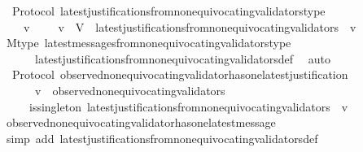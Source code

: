 \begin{isabellebody}
\isanewline
\isanewline
{}\isamarkupfalse%
\ {\isacharparenleft}\ Protocol{\isacharparenright}\ latest{\isacharunderscore}justifications{\isacharunderscore}from{\isacharunderscore}non{\isacharunderscore}equivocating{\isacharunderscore}validators{\isacharunderscore}type\ {\isacharcolon}\isanewline
\ \ {\isachardoublequoteopen}{\isasymforall}\ {\isasymsigma}\ v{\isachardot}\ {\isasymsigma}\ {\isasymin}\ {\isasymSigma}\ {\isasymand}\ v\ {\isasymin}\ V\ {\isasymlongrightarrow}\ latest{\isacharunderscore}justifications{\isacharunderscore}from{\isacharunderscore}non{\isacharunderscore}equivocating{\isacharunderscore}validators\ {\isasymsigma}\ v\ {\isasymsubseteq}\ {\isasymSigma}{\isachardoublequoteclose}\isanewline
%
\isadelimproof
\ \ %
\endisadelimproof
%
\isatagproof
{}\isamarkupfalse%
\ M{\isacharunderscore}type\ latest{\isacharunderscore}messages{\isacharunderscore}from{\isacharunderscore}non{\isacharunderscore}equivocating{\isacharunderscore}validators{\isacharunderscore}type\ \isanewline
\ \ \ \ \ \ latest{\isacharunderscore}justifications{\isacharunderscore}from{\isacharunderscore}non{\isacharunderscore}equivocating{\isacharunderscore}validators{\isacharunderscore}def\ \isamarkupfalse%
\ auto%
\endisatagproof
{\isafoldproof}%
%
\isadelimproof
\isanewline
%
\endisadelimproof
\isanewline
{}\isamarkupfalse%
\ {\isacharparenleft}\ Protocol{\isacharparenright}\ observed{\isacharunderscore}non{\isacharunderscore}equivocating{\isacharunderscore}validator{\isacharunderscore}has{\isacharunderscore}one{\isacharunderscore}latest{\isacharunderscore}justification\ {\isacharcolon}\ \isanewline
\ \ {\isachardoublequoteopen}{\isasymforall}\ {\isasymsigma}\ {\isasymin}\ {\isasymSigma}{\isachardot}\ v\ {\isasymin}\ observed{\isacharunderscore}non{\isacharunderscore}equivocating{\isacharunderscore}validators\ {\isasymsigma}\isanewline
\ \ \ \ {\isasymlongrightarrow}\ is{\isacharunderscore}singleton\ {\isacharparenleft}latest{\isacharunderscore}justifications{\isacharunderscore}from{\isacharunderscore}non{\isacharunderscore}equivocating{\isacharunderscore}validators\ {\isasymsigma}\ v{\isacharparenright}{\isachardoublequoteclose}\isanewline
%
\isadelimproof
\ \ %
\endisadelimproof
%
\isatagproof
{}\isamarkupfalse%
\ observed{\isacharunderscore}non{\isacharunderscore}equivocating{\isacharunderscore}validator{\isacharunderscore}has{\isacharunderscore}one{\isacharunderscore}latest{\isacharunderscore}message\isanewline
\ \ \isamarkupfalse%
\ {\isacharparenleft}simp\ add{\isacharcolon}\ latest{\isacharunderscore}justifications{\isacharunderscore}from{\isacharunderscore}non{\isacharunderscore}equivocating{\isacharunderscore}validators{\isacharunderscore}def{\isacharparenright}\isanewline

\end{isabellebody}
